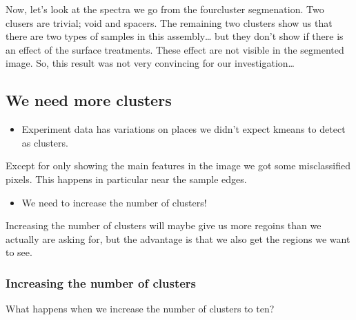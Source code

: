 \documentclass[letterpaper,10pt,english]{sphinxmanual}
\begin{document}
Now, let’s look at the spectra we go from the four\sphinxhyphen{}cluster segmenation. Two clusers are trivial; void and spacers. The remaining two clusters show us that there are two types of samples in this assembly… but they don’t show if there is an effect of the surface treatments. These effect are not visible in the segmented image. So, this result was not very convincing for our investigation…


\subsection{We need more clusters}
\label{\detokenize{ML4NeutronImageSegmentation:we-need-more-clusters}}\begin{itemize}
\item {} 
Experiment data has variations on places we didn’t expect k\sphinxhyphen{}means to detect as clusters.

\end{itemize}

Except for only showing the main features in the image we got some misclassified pixels. This happens in particular near the sample edges.
\begin{itemize}
\item {} 
We need to increase the number of clusters!

\end{itemize}

Increasing the number of clusters will maybe give us more regoins than we actually are asking for, but the advantage is that we also get the regions we want to see.


\subsubsection{Increasing the number of clusters}
\label{\detokenize{ML4NeutronImageSegmentation:increasing-the-number-of-clusters}}
What happens when we increase the number of clusters to ten?

\begin{sphinxVerbatim}[commandchars=\\\{\}]
   
   \PYG{p}{[}\PYG{p}{]} 
               
\end{sphinxVerbatim}
\end{document}

